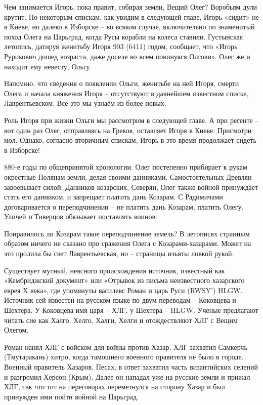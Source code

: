 Чем занимается Игорь, пока правит, собирая земли, Вещий Олег? Воробьям дули крутит. По некоторым спискам, как увидим в следующей главе, Игорь «сидит» не в Киеве, но далеко в Изборске – во всяком случае, включительно по знаменитый поход Олега на Царьград, когда Русы корабли на колеса ставили. Густынская летопись, датируя женитьбу Игоря 903 (6411) годом, сообщает, что «Игорь Рурикович дошед возраста, даже доселе во всем повинуяся Олгови». Олег же и находит ему невесту, Ольгу. 

Напомню, что сведения о появлении Ольги, женитьбе на ней Игоря, смерти Олега и начала княжения Игоря – отсутствуют в давнейшем известном списке, Лаврентьевском. Всё это мы узнаём из более новых.

Роль Игоря при жизни Ольги мы рассмотрим в следующей главе. А при регенте – вот один раз Олег, отправляясь на Греков, оставляет Игоря в Киеве. Присмотри мол. Однако, согласно вторичным спискам, Игорь в это время продолжает сидеть в Изборске!

880-е годы по общепринятой хронологии. Олег  постепенно прибирает к рукам окрестные Полянам земли, делая своими данниками. Самостоятельных Древлян завоевывает силой. Данников козарских, Северян, Олег также войной принуждает стать его данником, и запрещает платить дань Козарам. С Радимичами договаривается о переподчинении – не платить дань Козарам, платить Олегу. Уличей и Тиверцов обязывает поставлять воинов.

Понравилось ли Козарам такое переподчинение земель? В летописях странным образом ничего не сказано про сражения Олега с Козарами-хазарами. Может на это пролила бы свет Лаврентьевская, но – страницы изъяты ловкой рукой.

Существует мутный, неясного происхождения источник, известный как «Кембриджский документ» или «Отрывок из письма неизвестного хазарского еврея Х века», где упомянуты василевс Роман и царь Руси (RWSY’) HLGW. Источник сей известен на русском языке по двум переводам – Коковцева и Шехтера. У Коковцева имя царя – ХЛГ, у Шехтера – HLGW. Ученые предлагают читать сие как Халго, Хелго, Халги, Хелги и отождествляют ХЛГ с Вещим Олегом. 

Роман нанял ХЛГ с войском для войны против Хазар. ХЛГ захватил Самкерчь (Тмутаракань) хитро, когда тамошнего военного правителя не было в городе. Военный правитель Хазаров, Песах, в ответ захватил часть византийских селений и разгромил Херсон (Крым). Далее он нападал уже на русские земли и прижал ХЛГ, так что тот на переговорах переметнулся на сторону Хазар и был принужден ими пойти войной на Царьград.

